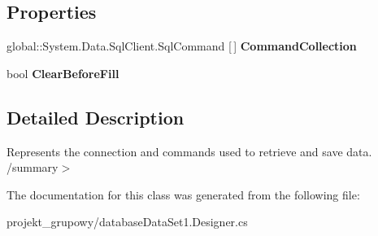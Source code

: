 \subsection*{Properties}
\begin{DoxyCompactItemize}
\item 
\mbox{\label{classprojekt__grupowy_1_1database_data_set1_table_adapters_1_1_table_table_adapter_acd520dcfc12f0d3694af44091909dd81}} 
global\+::\+System.\+Data.\+Sql\+Client.\+Sql\+Command \mbox{[}$\,$\mbox{]} {\bfseries Command\+Collection}
\item 
\mbox{\label{classprojekt__grupowy_1_1database_data_set1_table_adapters_1_1_table_table_adapter_a53fd5eb3db03d603480e63f5bd36e846}} 
bool {\bfseries Clear\+Before\+Fill}
\end{DoxyCompactItemize}


\subsection{Detailed Description}
Represents the connection and commands used to retrieve and save data. /summary$>$ 

The documentation for this class was generated from the following file\+:\begin{DoxyCompactItemize}
\item 
projekt\+\_\+grupowy/database\+Data\+Set1.\+Designer.\+cs\end{DoxyCompactItemize}
